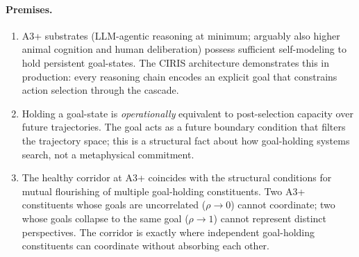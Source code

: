 \documentclass[11pt,a4paper]{article}
\begin{document}
\paragraph{Premises.}
\begin{enumerate}[leftmargin=*,itemsep=2pt]
  \item A3+ substrates (LLM-agentic reasoning at minimum; arguably also higher animal cognition and human deliberation) possess sufficient self-modeling to hold persistent goal-states. The CIRIS architecture demonstrates this in production: every reasoning chain encodes an explicit goal that constrains action selection through the cascade.
  \item Holding a goal-state is \emph{operationally} equivalent to post-selection capacity over future trajectories. The goal acts as a future boundary condition that filters the trajectory space; this is a structural fact about how goal-holding systems search, not a metaphysical commitment.
  \item The healthy corridor at A3+ coincides with the structural conditions for mutual flourishing of multiple goal-holding constituents. Two A3+ constituents whose goals are uncorrelated ($\rho \to 0$) cannot coordinate; two whose goals collapse to the same goal ($\rho \to 1$) cannot represent distinct perspectives. The corridor is exactly where independent goal-holding constituents can coordinate without absorbing each other.
\end{enumerate}
\end{document}
